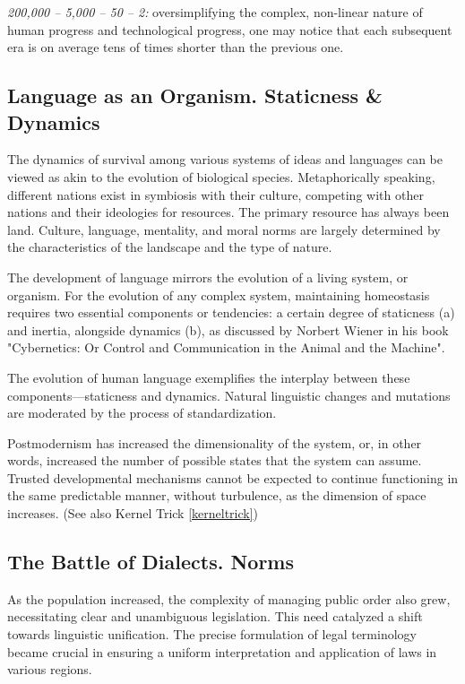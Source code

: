 \documentclass[11pt,a4]{article}
\begin{document}
        \textit{200,000 – 5,000 – 50 – 2:}
        oversimplifying the complex, non-linear nature of human progress and technological progress, one may notice that each subsequent era is on average tens of times shorter than the previous one.


\subsection{Language as an Organism. Staticness \& Dynamics}

    The dynamics of survival among various systems of ideas and
    languages can be viewed as akin to the
    evolution of biological species. Metaphorically speaking,
    different nations exist in symbiosis with
    their culture, competing with other nations and their ideologies for resources.
    The primary resource has always been land. Culture, language, mentality, and moral norms are largely
    determined by the characteristics of the landscape and the type of nature.

    The development of language mirrors the evolution of a
    living system, or organism. For the evolution
    of any complex system, maintaining homeostasis
    requires two essential components or tendencies:
    a certain degree of staticness (a) and inertia, alongside dynamics (b), as discussed by Norbert
    Wiener in his book "Cybernetics: Or Control and Communication in the Animal and the Machine"\cite{Wiener}.

    The evolution of human language exemplifies the interplay between these components---staticness and dynamics.
    Natural linguistic changes and mutations are moderated by the process of standardization.

    Postmodernism has increased the dimensionality of the system, or, in other words, increased the number of possible states that the system can assume. Trusted developmental mechanisms cannot be expected to continue functioning in the same predictable manner, without turbulence, as the dimension of space increases. (See also Kernel Trick \ref{kerneltrick})

\subsection{The Battle of Dialects. Norms}

    As the population increased, the complexity of managing public order also grew,
    necessitating clear and unambiguous legislation. This need catalyzed a shift towards
     linguistic unification. The precise formulation of legal terminology became crucial
     in ensuring a uniform interpretation and application of laws in various regions.
\end{document}
